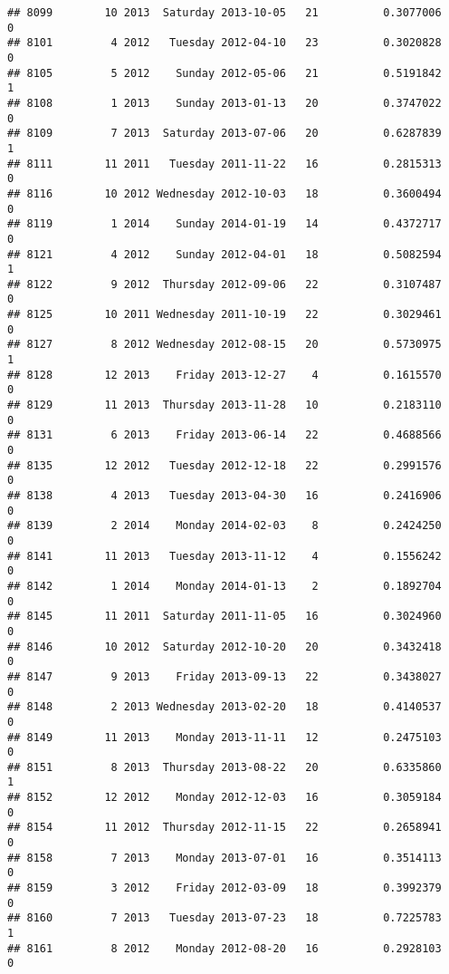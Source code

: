 \documentclass[
]{article}
\begin{document}
\begin{verbatim}
## 8099        10 2013  Saturday 2013-10-05   21          0.3077006             0
## 8101         4 2012   Tuesday 2012-04-10   23          0.3020828             0
## 8105         5 2012    Sunday 2012-05-06   21          0.5191842             1
## 8108         1 2013    Sunday 2013-01-13   20          0.3747022             0
## 8109         7 2013  Saturday 2013-07-06   20          0.6287839             1
## 8111        11 2011   Tuesday 2011-11-22   16          0.2815313             0
## 8116        10 2012 Wednesday 2012-10-03   18          0.3600494             0
## 8119         1 2014    Sunday 2014-01-19   14          0.4372717             0
## 8121         4 2012    Sunday 2012-04-01   18          0.5082594             1
## 8122         9 2012  Thursday 2012-09-06   22          0.3107487             0
## 8125        10 2011 Wednesday 2011-10-19   22          0.3029461             0
## 8127         8 2012 Wednesday 2012-08-15   20          0.5730975             1
## 8128        12 2013    Friday 2013-12-27    4          0.1615570             0
## 8129        11 2013  Thursday 2013-11-28   10          0.2183110             0
## 8131         6 2013    Friday 2013-06-14   22          0.4688566             0
## 8135        12 2012   Tuesday 2012-12-18   22          0.2991576             0
## 8138         4 2013   Tuesday 2013-04-30   16          0.2416906             0
## 8139         2 2014    Monday 2014-02-03    8          0.2424250             0
## 8141        11 2013   Tuesday 2013-11-12    4          0.1556242             0
## 8142         1 2014    Monday 2014-01-13    2          0.1892704             0
## 8145        11 2011  Saturday 2011-11-05   16          0.3024960             0
## 8146        10 2012  Saturday 2012-10-20   20          0.3432418             0
## 8147         9 2013    Friday 2013-09-13   22          0.3438027             0
## 8148         2 2013 Wednesday 2013-02-20   18          0.4140537             0
## 8149        11 2013    Monday 2013-11-11   12          0.2475103             0
## 8151         8 2013  Thursday 2013-08-22   20          0.6335860             1
## 8152        12 2012    Monday 2012-12-03   16          0.3059184             0
## 8154        11 2012  Thursday 2012-11-15   22          0.2658941             0
## 8158         7 2013    Monday 2013-07-01   16          0.3514113             0
## 8159         3 2012    Friday 2012-03-09   18          0.3992379             0
## 8160         7 2013   Tuesday 2013-07-23   18          0.7225783             1
## 8161         8 2012    Monday 2012-08-20   16          0.2928103             0

\end{verbatim}
\end{document}

